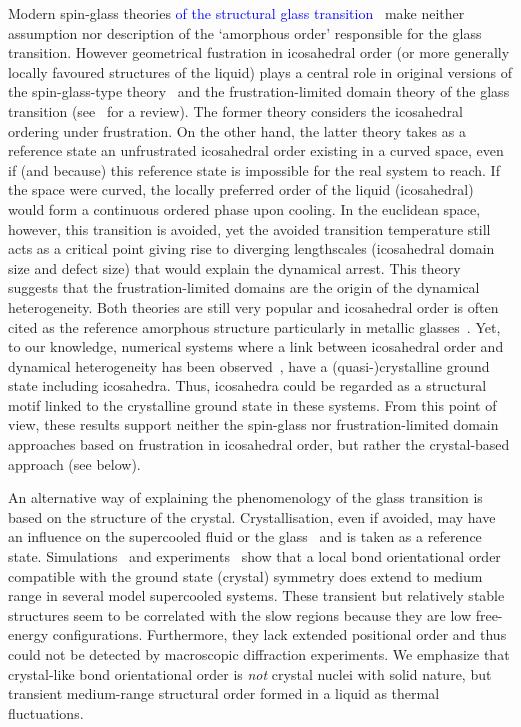 Modern spin-glass theories \textcolor{blue}{of the structural glass transition}~\cite{lubchenko2007, Biroli2008, Parisi2010} make neither assumption nor description of the `amorphous order' responsible for the glass transition. However geometrical fustration in icosahedral order (or more generally locally favoured structures of the liquid) plays a central role in original versions of the spin-glass-type theory~\cite{steinhardt1983boo,sadoc1999geometrical} and the frustration-limited domain theory of the glass transition (see~\citep{tarjus2005fba} for a review). The former theory considers the icosahedral ordering under frustration. On the other hand, the latter theory takes as a reference state an unfrustrated icosahedral order existing in a curved space, even if (and because) this reference state is impossible for the real system to reach. If the space were curved, the locally preferred order of the liquid (icosahedral) would form a continuous ordered phase upon cooling. In the  euclidean space, however, this transition is avoided, yet the avoided transition temperature still acts as a critical point giving rise to diverging lengthscales (icosahedral domain size and defect size) that would explain the dynamical arrest. This theory suggests that the frustration-limited domains are the origin of the dynamical heterogeneity. Both theories are still very popular and icosahedral order is often cited as the reference amorphous structure particularly in metallic glasses~\citep{Reichert2000, Celino2007, Luo2004, Wang2011}. Yet, to our knowledge, numerical systems where a link between icosahedral order and dynamical heterogeneity has been observed~\citep{Doye2003, Pedersen2010, Coslovich2011}, have a (quasi-)crystalline ground state including icosahedra. Thus, icosahedra could be regarded as a structural motif linked to the crystalline ground state in these systems. From this point of view, these results support neither the spin-glass nor frustration-limited domain approaches based on frustration in icosahedral order, but rather the crystal-based approach (see below).

An alternative way of explaining the phenomenology of the glass transition is based on the structure of the crystal. Crystallisation, even if avoided, may have an influence on the supercooled fluid or the glass~\citep{TanakaGJPCM, Cavagna2003, VanMegen2009a} and is taken as a reference state. Simulations~\cite{tanaka2010critical, Pedersen2010, Coslovich2011} and experiments~\citep{tanaka2010critical} show that a local bond orientational order compatible with the ground state (crystal) symmetry does extend to medium range in several model supercooled systems. These transient but relatively stable structures seem to be correlated with the slow regions because they are low free-energy configurations. Furthermore, they lack extended positional order and thus could not be detected by macroscopic diffraction experiments. We emphasize that crystal-like bond orientational order is \emph{not} crystal nuclei with solid nature, but transient medium-range structural order formed in a liquid as thermal fluctuations. 


